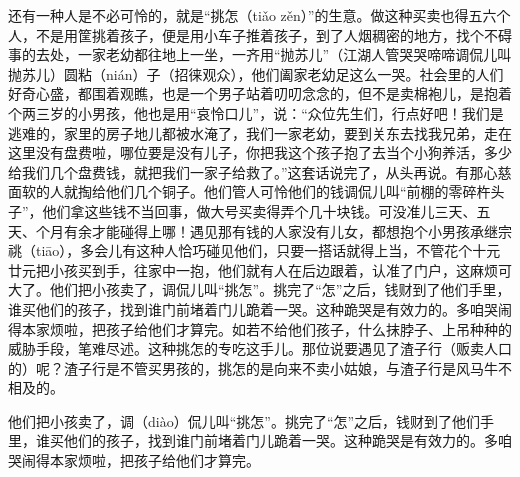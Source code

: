 \documentclass[12pt,UTF8]{ctexbook}
\begin{document}
还有一种人是不必可怜的，就是“挑怎（tiǎo zěn）”的生意。做这种买卖也得五六个人，不是用筐挑着孩子，便是用小车子推着孩子，到了人烟稠密的地方，找个不碍事的去处，一家老幼都往地上一坐，一齐用“抛苏儿”（江湖人管哭哭啼啼调侃儿叫抛苏儿）圆粘（nián）子（招徕观众），他们阖家老幼足这么一哭。社会里的人们好奇心盛，都围着观瞧，也是一个男子站着叨叨念念的，但不是卖棉袍儿，是抱着个两三岁的小男孩，他也是用“哀怜口儿”，说：“众位先生们，行点好吧！我们是逃难的，家里的房子地儿都被水淹了，我们一家老幼，要到关东去找我兄弟，走在这里没有盘费啦，哪位要是没有儿子，你把我这个孩子抱了去当个小狗养活，多少给我们几个盘费钱，就把我们一家子给救了。”这套话说完了，从头再说。有那心慈面软的人就掏给他们几个铜子。他们管人可怜他们的钱调侃儿叫“前棚的零碎杵头子”，他们拿这些钱不当回事，做大号买卖得弄个几十块钱。可没准儿三天、五天、个月有余才能碰得上哪！遇见那有钱的人家没有儿女，都想抱个小男孩承继宗祧（tiāo），多会儿有这种人恰巧碰见他们，只要一搭话就得上当，不管花个十元廿元把小孩买到手，往家中一抱，他们就有人在后边跟着，认准了门户，这麻烦可大了。他们把小孩卖了，调侃儿叫“挑怎”。挑完了“怎”之后，钱财到了他们手里，谁买他们的孩子，找到谁门前堵着门儿跪着一哭。这种跪哭是有效力的。多咱哭闹得本家烦啦，把孩子给他们才算完。如若不给他们孩子，什么抹脖子、上吊种种的威胁手段，笔难尽述。这种挑怎的专吃这手儿。那位说要遇见了渣子行（贩卖人口的）呢？渣子行是不管买男孩的，挑怎的是向来不卖小姑娘，与渣子行是风马牛不相及的。

他们把小孩卖了，调（diào）侃儿叫“挑怎”。挑完了“怎”之后，钱财到了他们手里，谁买他们的孩子，找到谁门前堵着门儿跪着一哭。这种跪哭是有效力的。多咱哭闹得本家烦啦，把孩子给他们才算完。
\end{document}
